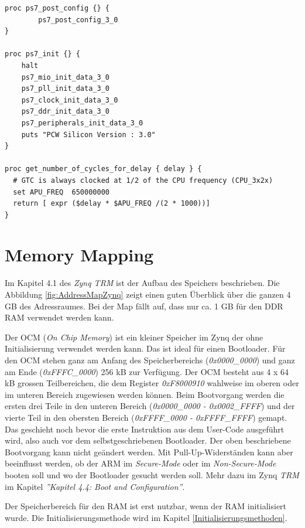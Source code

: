 \begin{enumerate}
\begin{lstlisting}[frame=single]
proc ps7_post_config {} {
        ps7_post_config_3_0   
}

proc ps7_init {} {
	halt
	ps7_mio_init_data_3_0
	ps7_pll_init_data_3_0
	ps7_clock_init_data_3_0
	ps7_ddr_init_data_3_0
	ps7_peripherals_init_data_3_0
	puts "PCW Silicon Version : 3.0"
}

proc get_number_of_cycles_for_delay { delay } {
  # GTC is always clocked at 1/2 of the CPU frequency (CPU_3x2x)
  set APU_FREQ  650000000
  return [ expr ($delay * $APU_FREQ /(2 * 1000))]
}
\end{lstlisting}

\end{enumerate}





\section{Memory Mapping}
\label{MemoryMapping}
Im Kapitel 4.1 des \textit{Zynq TRM}\cite{bib:ZynqTechnicalReferenceManual} ist der Aufbau des Speichers beschrieben.
Die Abbildung \ref{fig:AddressMapZynq} zeigt einen guten Überblick über die ganzen 4 GB des Adressraumes.
Bei der Map fällt auf, dass nur ca. 1 GB für den DDR RAM verwendet werden kann.

Der OCM (\textit{On Chip Memory}) ist ein kleiner Speicher im Zynq der ohne Initialisierung verwendet werden kann. 
Das ist ideal für einen Bootloader.
Für den OCM stehen ganz am Anfang des Speicherbereichs (\textit{0x0000\_0000}) und ganz am Ende (\textit{0xFFFC\_0000}) 256 kB zur Verfügung.
Der OCM besteht aus 4 x 64 kB grossen Teilbereichen, die dem Register \textit{0xF8000910} wahlweise im oberen oder im unteren Bereich zugewiesen werden können.
Beim Bootvorgang werden die ersten drei Teile in den unteren Bereich (\textit{0x0000\_0000 - 0x0002\_FFFF}) und der vierte Teil in den obersten Bereich (\textit{0xFFFF\_0000 - 0xFFFF\_FFFF}) gemapt.
Das geschieht noch bevor die erste Instruktion aus dem User-Code ausgeführt wird, also auch vor dem selbstgeschriebenen Bootloader.
Der oben beschriebene Bootvorgang kann nicht geändert werden.
Mit Pull-Up-Widerständen kann aber beeinflusst werden, ob der ARM im \textit{Secure-Mode} oder im \textit{Non-Secure-Mode} booten soll und wo der Bootloader gesucht werden soll.
Mehr dazu im Zynq \textit{TRM}\cite{bib:ZynqTechnicalReferenceManual} im Kapitel \textit{''Kapitel 4.4: Boot and Configuration''}.

Der Speicherbereich für den RAM ist erst nutzbar, wenn der RAM initialisiert wurde.
Die Initialisierungsmethode wird im Kapitel \ref{Initialisierungsmethoden}.

